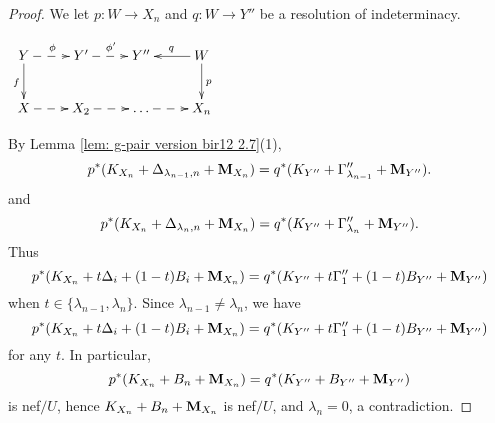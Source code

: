 \documentclass[11pt]{amsart}
\numberwithin{equation}{section}
\newcommand{\Mm}{{\bf{M}}}
\theoremstyle{definition}
\theoremstyle{definition}
\theoremstyle{definition}
\begin{document}
\begin{proof}
We let $p: W\rightarrow X_n$ and $q: W\rightarrow Y''$ be a resolution of indeterminacy. 
\begin{center}$\xymatrix{
Y\ar@{->}[d]_{f}\ar@{-->}[r]^{\phi}& Y'\ar@{-->}[r]^{\phi'} & Y''& W\ar@{->}[d]^{p}\ar@{->}[l]_{q}\\
 X\ar@{-->}[r]& X_2\ar@{-->}[r] & \dots\ar@{-->}[r] & X_n
}$
\end{center}
By Lemma \ref{lem: g-pair version bir12 2.7}(1),
$$p^*(K_{X_n}+\Delta_{\lambda_{n-1},n}+\Mm_{X_n})=q^*(K_{Y''}+\Gamma''_{\lambda_{n-1}}+\Mm_{Y''}).$$
and
$$p^*(K_{X_n}+\Delta_{\lambda_{n},n}+\Mm_{X_n})=q^*(K_{Y''}+\Gamma''_{\lambda_{n}}+\Mm_{Y''}).$$
Thus
$$p^*(K_{X_n}+t\Delta_i+(1-t)B_i+\Mm_{X_n})=q^*(K_{Y''}+t\Gamma''_1+(1-t)B_{Y''}+\Mm_{Y''})$$
when $t\in\{\lambda_{n-1},\lambda_{n}\}$. Since $\lambda_{n-1}\not=\lambda_n$, we have
$$p^*(K_{X_n}+t\Delta_i+(1-t)B_i+\Mm_{X_n})=q^*(K_{Y''}+t\Gamma''_1+(1-t)B_{Y''}+\Mm_{Y''})$$
for any $t$. In particular,
$$p^*(K_{X_n}+B_n+\Mm_{X_n})=q^*(K_{Y''}+B_{Y''}+\Mm_{Y''})$$
is nef$/U$, hence $K_{X_n}+B_n+\Mm_{X_n}$ is nef$/U$, and $\lambda_n=0$, a contradiction.
\end{proof}
\end{document}
